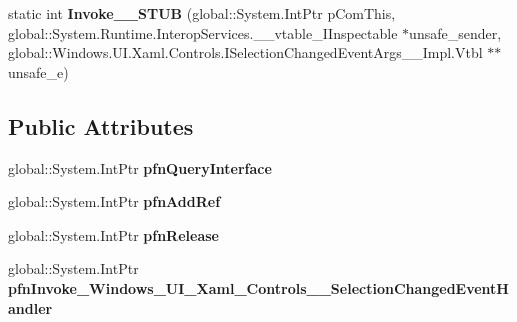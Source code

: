 \begin{DoxyCompactItemize}
\item 
\mbox{\label{struct_windows_1_1_u_i_1_1_xaml_1_1_controls_1_1_selection_changed_event_handler_____impl_1_1_vtbl_ae17163bc26cb1925dcb05040735769e6}} 
static int {\bfseries Invoke\+\_\+\+\_\+\+S\+T\+UB} (global\+::\+System.\+Int\+Ptr p\+Com\+This, global\+::\+System.\+Runtime.\+Interop\+Services.\+\_\+\+\_\+vtable\+\_\+\+I\+Inspectable $\ast$unsafe\+\_\+sender, global\+::\+Windows.\+U\+I.\+Xaml.\+Controls.\+I\+Selection\+Changed\+Event\+Args\+\_\+\+\_\+\+Impl.\+Vtbl $\ast$$\ast$unsafe\+\_\+e)
\end{DoxyCompactItemize}
\subsection*{Public Attributes}
\begin{DoxyCompactItemize}
\item 
\mbox{\label{struct_windows_1_1_u_i_1_1_xaml_1_1_controls_1_1_selection_changed_event_handler_____impl_1_1_vtbl_ad1a78d48166fcb330bd82dba07b80e48}} 
global\+::\+System.\+Int\+Ptr {\bfseries pfn\+Query\+Interface}
\item 
\mbox{\label{struct_windows_1_1_u_i_1_1_xaml_1_1_controls_1_1_selection_changed_event_handler_____impl_1_1_vtbl_a0ba6aeb19759630adafc946dfa759a5b}} 
global\+::\+System.\+Int\+Ptr {\bfseries pfn\+Add\+Ref}
\item 
\mbox{\label{struct_windows_1_1_u_i_1_1_xaml_1_1_controls_1_1_selection_changed_event_handler_____impl_1_1_vtbl_acbd3296c412d25b639ef4772350dc1c5}} 
global\+::\+System.\+Int\+Ptr {\bfseries pfn\+Release}
\item 
\mbox{\label{struct_windows_1_1_u_i_1_1_xaml_1_1_controls_1_1_selection_changed_event_handler_____impl_1_1_vtbl_a5e2b07cbec65ca6f2f102af4308d9d7a}} 
global\+::\+System.\+Int\+Ptr {\bfseries pfn\+Invoke\+\_\+\+Windows\+\_\+\+U\+I\+\_\+\+Xaml\+\_\+\+Controls\+\_\+\+\_\+\+Selection\+Changed\+Event\+Handler}
\end{DoxyCompactItemize}
